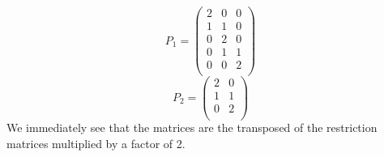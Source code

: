 \documentclass{scrartcl}
\begin{document}
\begin{equation}
	P_1 = \begin{pmatrix}
	2&0&0\\
	1&1&0\\
	0&2&0\\
	0&1&1\\
	0&0&2\\
	\end{pmatrix}
\end{equation}
\begin{equation}
	P_2 = \begin{pmatrix}
	2&0\\
	1&1\\
	0&2\\
	\end{pmatrix}
\end{equation}
We immediately see that the matrices are the transposed of the restriction matrices multiplied by a factor of 2.
\end{document}
